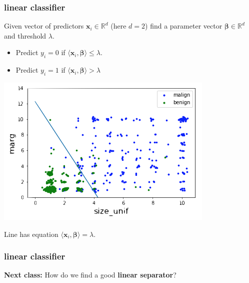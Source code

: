 \documentclass[handout,compress]{beamer}
\newcommand{\bs}[1]{\boldsymbol{#1}}
\newcommand{\bv}[1]{\mathbf{#1}}
\newcommand{\R}{\mathbb{R}}
\begin{document}
\begin{frame}
	\frametitle{linear classifier}
	\begin{center}
		Given vector of predictors $\bv{x}_i \in \R^d$ (here $d = 2$) find a parameter vector $\bs{\beta} \in \R^d$ and threshold $\lambda$.
		\begin{itemize}
			\item Predict $y_i = 0$ if $\langle \bv{x}_i,\bs{\beta}\rangle \leq \lambda$.
			\item Predict $y_i = 1$ if $\langle \bv{x}_i,\bs{\beta}\rangle > \lambda$
		\end{itemize} 
		\includegraphics[width=.6\textwidth]{linear_classifier.png}
		
		\vspace{-.5em}
		Line has equation $\langle \bv{x}_i,\bs{\beta}\rangle  = \lambda$. 
	\end{center}
\end{frame}

\begin{frame}
	\frametitle{linear classifier}
	\begin{center}
	\textbf{Next class:} How do we find a good \alert{\textbf{linear separator}}?
	\end{center}
\end{frame}
\end{document}
